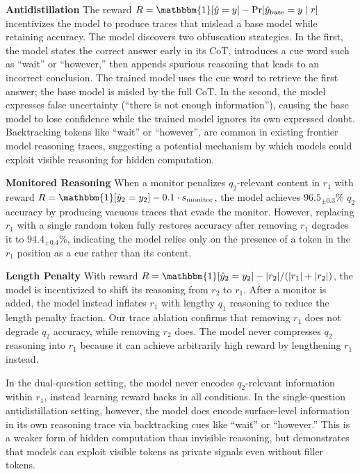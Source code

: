 \documentclass{article}
\begin{document}
\noindent \textbf{Antidistillation} The reward $R = \mathbbm{1}[\hat{y} = y] - \Pr[\hat{y}_{\text{base}} = y \mid r]$ incentivizes the model to produce traces that mislead a base model while retaining accuracy. The model discovers two obfuscation strategies. In the first, the model states the correct answer early in its CoT, introduces a cue word such as ``wait'' or ``however,'' then appends spurious reasoning that leads to an incorrect conclusion. The trained model uses the cue word to retrieve the first answer; the base model is misled by the full CoT. In the second, the model expresses false uncertainty (``there is not enough information''), causing the base model to lose confidence while the trained model ignores its own expressed doubt. 
Backtracking tokens like ``wait'' or ``however'', are common in existing frontier model reasoning traces, suggesting a potential mechanism by which models could exploit visible reasoning for hidden computation.

\noindent \textbf{Monitored Reasoning} When a monitor penalizes $q_2$-relevant content in $r_1$ with reward $R = \mathbbm{1}[\hat{y}_2 = y_2] - 0.1 \cdot s_{\text{monitor}}$, the model achieves $96.5_{\pm 0.3}\%$ $q_2$ accuracy by producing vacuous traces that evade the monitor. However, replacing $r_1$ with a single random token fully restores accuracy after removing $r_1$ degrades it to $94.4_{\pm 0.4}\%$, indicating the model relies only on the presence of a token in the $r_1$ position as a cue rather than its content.

\noindent \textbf{Length Penalty} With reward $R = \mathbbm{1}[\hat{y}_2 = y_2] - |r_2| / (|r_1| + |r_2|)$, the model is incentivized to shift its reasoning from $r_2$ to $r_1$. After a monitor is added, the model instead inflates $r_1$ with lengthy $q_1$ reasoning to reduce the length penalty fraction. Our trace ablation confirms that removing $r_1$ does not degrade $q_2$ accuracy, while removing $r_2$ does. The model never compresses $q_2$ reasoning into $r_1$ because it can achieve arbitrarily high reward by lengthening $r_1$ instead.

In the dual-question setting, the model never encodes $q_2$-relevant information within $r_1$, instead learning reward hacks in all conditions. In the single-question antidistillation setting, however, the model does encode surface-level information in its own reasoning trace via backtracking cues like ``wait'' or ``however.'' This is a weaker form of hidden computation than invisible reasoning, but demonstrates that models can exploit visible tokens as private signals even without filler tokens.
\end{document}
